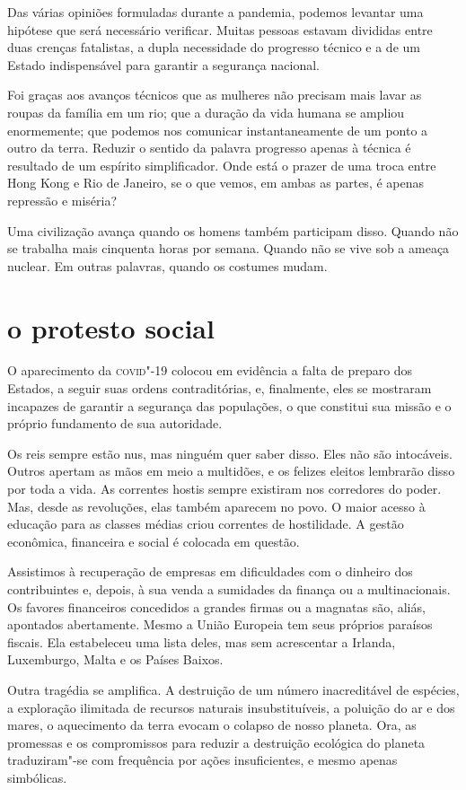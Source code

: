 Das várias opiniões formuladas durante a pandemia, podemos levantar uma
hipótese que será necessário verificar. Muitas pessoas estavam divididas
entre duas crenças fatalistas, a dupla necessidade do progresso técnico
e a de um Estado indispensável para garantir a segurança nacional.

Foi graças aos avanços técnicos que as mulheres não precisam mais lavar
as roupas da família em um rio; que a duração da vida humana se ampliou
enormemente; que podemos nos comunicar instantaneamente de um ponto a
outro da terra. Reduzir o sentido da palavra progresso apenas à técnica
é resultado de um espírito simplificador. Onde está o prazer de uma
troca entre Hong Kong e Rio de Janeiro, se o que vemos, em ambas as
partes, é apenas repressão e miséria?

Uma civilização avança quando os homens também participam disso. Quando
não se trabalha mais cinquenta horas por semana. Quando não se vive sob
a ameaça nuclear. Em outras palavras, quando os costumes mudam.

\section{o protesto social}

O aparecimento da \textsc{covid}"-19 colocou em evidência a falta de preparo dos
Estados, a seguir suas ordens contraditórias, e, finalmente, eles se
mostraram incapazes de garantir a segurança das populações, o que
constitui sua missão e o próprio fundamento de sua autoridade.

Os reis sempre estão nus, mas ninguém quer saber disso. Eles não são
intocáveis. Outros apertam as mãos em meio a multidões, e os felizes
eleitos lembrarão disso por toda a vida. As correntes hostis sempre
existiram nos corredores do poder. Mas, desde as revoluções, elas também
aparecem no povo. O maior acesso à educação para as classes médias criou
correntes de hostilidade. A gestão econômica, financeira e social é
colocada em questão.

Assistimos à recuperação de empresas em dificuldades com o dinheiro dos
contribuintes e, depois, à sua venda a sumidades da finança ou a
multinacionais. Os favores financeiros concedidos a grandes firmas ou a
magnatas são, aliás, apontados abertamente. Mesmo a União Europeia tem
seus próprios paraísos fiscais. Ela estabeleceu uma lista deles, mas sem
acrescentar a Irlanda, Luxemburgo, Malta e os Países Baixos.

Outra tragédia se amplifica. A destruição de um número inacreditável de
espécies, a exploração ilimitada de recursos naturais insubstituíveis, a
poluição do ar e dos mares, o aquecimento da terra evocam o colapso de
nosso planeta. Ora, as promessas e os compromissos para reduzir a
destruição ecológica do planeta traduziram"-se com frequência por ações
insuficientes, e mesmo apenas simbólicas.

